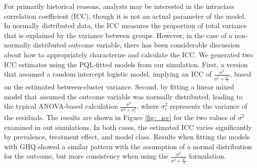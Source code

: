 \documentclass{article}
\begin{document}
\begin{flushleft}

For primarily historical reasons, analysts may be interested in the intraclass correlation coefficient (ICC), though it is not an actual parameter of the model. In normally distributed data, the ICC measures the proportion of total variance that is explained by the variance between groups. However, in the case of a non-normally distributed outcome variable, there has been considerable discussion about how to appropriately characterize and calculate the ICC\cite{wu_comparison_2012}\cite{nakagawa_shinichi_coefficient_2017}. We generated two ICC estimates using the PQL-fitted models from our simulation.  First, a version that assumed a random intercept logistic model, implying an ICC of $\frac{\sigma^2}{\sigma^2+\frac{\pi^2}{3}}$, based on the estimated between-cluster variance. Second, by fitting a linear mixed model that assumed the outcome variable was normally distributed, leading to the typical ANOVA-based calculation $\frac{\sigma^2}{\sigma^2+\sigma^2_{\epsilon}}$, where $\sigma^2_{\epsilon}$ represents the variance of the residuals. The results are shown in Figure \ref{fig:_icc} for the two values of $\sigma^2$ examined in out simulations. In both cases, the estimated ICC varies significantly by prevalence, treatment effect, and model class. Results when fitting the models with GHQ showed a similar pattern with the assumption of a normal distribution for the outcome, but more consistency when using the $\frac{\sigma^2}{\sigma^2+\frac{\pi^2}{3}}$ formulation. 


\end{flushleft}
\end{document}

